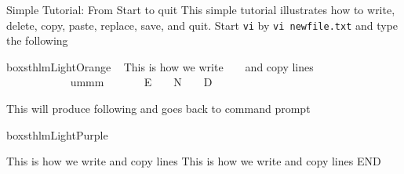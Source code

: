 \documentclass[newPxFont,sthlmFooter,nooffset]{beamer}
\begin{document}
\begin{frame}[containsverbatim,t]{Simple Tutorial: From Start to quit}
This simple tutorial illustrates how to write, delete, copy, paste, replace, save, and quit. Start \texttt{vi} by \texttt{vi newfile.txt}  and type the following
\begin{beamercolorbox}[sep=1em,wd=\linewidth]{boxsthlmLightOrange}
~ This is how we write ~ ~ and copy lines ~ ~ ~~ ~ ~
~ ~ ~ ~ ~ \keystroke{)}~ ~ ~ ~ ~ ~ ummm ~ ~ ~ ~
E ~ ~ N ~ ~ D \keystroke{:}~ ~ ~ ~
\end{beamercolorbox}
\bigskip

This will produce following and goes back to command prompt

\begin{beamercolorbox}[wd=\linewidth]{boxsthlmLightPurple}
\begin{sthlmLatex}
This is how we write
and copy lines
This is how we write and copy lines
END
\end{sthlmLatex}
\end{beamercolorbox}

\end{frame}
\end{document}
